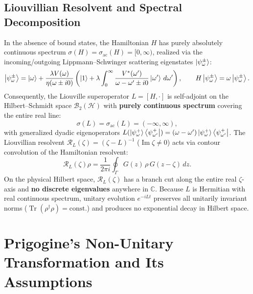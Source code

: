 \documentclass[11pt,a4paper]{article}
\begin{document}
\subsection{Liouvillian Resolvent and Spectral Decomposition}
In the absence of bound states, the Hamiltonian $H$ has purely absolutely continuous spectrum $\sigma(H) = \sigma_{\mathrm{ac}}(H) = [0, \infty)$, realized via the incoming/outgoing Lippmann--Schwinger scattering eigenstates $\ket{\psi_\omega^\pm}$:
\begin{equation}
\ket{\psi_\omega^\pm} = \ket{\omega} + \frac{\lambda V(\omega)}{\eta(\omega \pm i0)} \left( \ket{1} + \lambda \int_0^\infty \frac{V^*(\omega')}{\omega - \omega' \pm i0} \ket{\omega'} \, d\omega' \right), \qquad H\ket{\psi_\omega^\pm} = \omega \ket{\psi_\omega^\pm}.
\end{equation}
Consequently, the Liouville superoperator $L = [H, \cdot]$ is self-adjoint on the Hilbert--Schmidt space $\mathcal{B}_2(\mathcal{H})$ with \textbf{purely continuous spectrum} covering the entire real line:
\begin{equation}
\sigma(L) = \sigma_{\mathrm{ac}}(L) = (-\infty, \infty),
\end{equation}
with generalized dyadic eigenoperators $L(\ket{\psi_\omega^+}\bra{\psi_{\omega'}^+}) = (\omega - \omega') \ket{\psi_\omega^+}\bra{\psi_{\omega'}^+}$. The Liouvillian resolvent $\mathcal{R}_L(\zeta) = (\zeta - L)^{-1}$ ($\operatorname{Im} \zeta \neq 0$) acts via contour convolution of the Hamiltonian resolvent:
\begin{equation}
\mathcal{R}_L(\zeta)\rho = \frac{1}{2\pi i} \oint_{\Gamma} G(z) \, \rho \, G(z - \zeta) \, dz.
\end{equation}
On the physical Hilbert space, $\mathcal{R}_L(\zeta)$ has a branch cut along the entire real $\zeta$-axis and \textbf{no discrete eigenvalues} anywhere in $\mathbb{C}$. Because $L$ is Hermitian with real continuous spectrum, unitary evolution $e^{-iLt}$ preserves all unitarily invariant norms ($\operatorname{Tr}(\rho^\dagger \rho) = \text{const.}$) and produces no exponential decay in Hilbert space.

\section{Prigogine's Non-Unitary Transformation and Its Assumptions}
\end{document}
